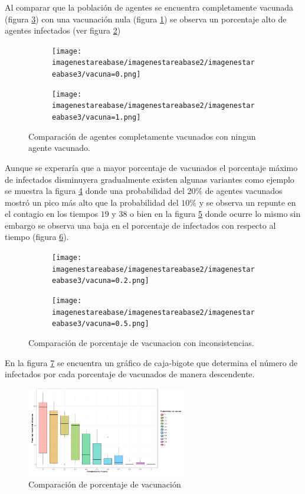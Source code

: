 \documentclass[a4paper]{article}
\begin{document}
\newpage
\justify Al comparar que la población de agentes se encuentra completamente vacunada (figura \ref{123}) con una vacunación nula (figura \ref{c12}) se observa un porcentaje alto de agentes infectados (ver figura \ref{x})
\begin{figure}[h!]
    \centering
\begin{subfigure}[b]{0.45\linewidth}
\texttt{[image: imagenestareabase/imagenestareabase2/imagenestareabase3/vacuna=0.png]}
\caption{}
\label{c12}
\end{subfigure}
\begin{subfigure}[b]{0.45\linewidth}
\texttt{[image: imagenestareabase/imagenestareabase2/imagenestareabase3/vacuna=1.png]}
\caption{}
\label{x}
\end{subfigure}
\caption{Comparación de agentes completamente vacunados con ningun agente vacunado.}
\label{123}
\end{figure}

\justify Aunque se experaría que a mayor porcentaje de vacunados el porcentaje máximo de infectados disminuyera gradualmente existen algunas variantes como ejemplo se muestra la figura \ref{c14} donde una probabilidad del $20 \%$ de agentes vacunados mostró un pico más alto que la probabilidad del $10 \%$ y se observa un repunte en el contagio en los tiempos $19$ y $38$ o bien en la figura \ref{c15} donde ocurre lo mismo sin embargo se observa una baja  en el porcentaje de infectados con respecto al tiempo (figura \ref{fig:8}).
\begin{figure}[h!]
    \centering
\begin{subfigure}[b]{0.45\linewidth}
\texttt{[image: imagenestareabase/imagenestareabase2/imagenestareabase3/vacuna=0.2.png]}
\caption{}
\label{c14}
\end{subfigure}
\begin{subfigure}[b]{0.45\linewidth}
\texttt{[image: imagenestareabase/imagenestareabase2/imagenestareabase3/vacuna=0.5.png]}
\caption{}
\label{c15}
\end{subfigure}
\caption{Comparación de porcentaje de vacunacion con inconsistencias.}
    \label{fig:8}
\end{figure}

\justify En la figura \ref{fig:15} se encuentra un gráfico de caja-bigote que determina el número de infectados por cada porcentaje de vacunados de manera descendente. 

\begin{figure}[h!]
    \centering
\includegraphics[width=70mm]{porcientos.png}
\caption{Comparación de porcentaje de vacunación}
    \label{fig:15}
\end{figure}
\end{document}
